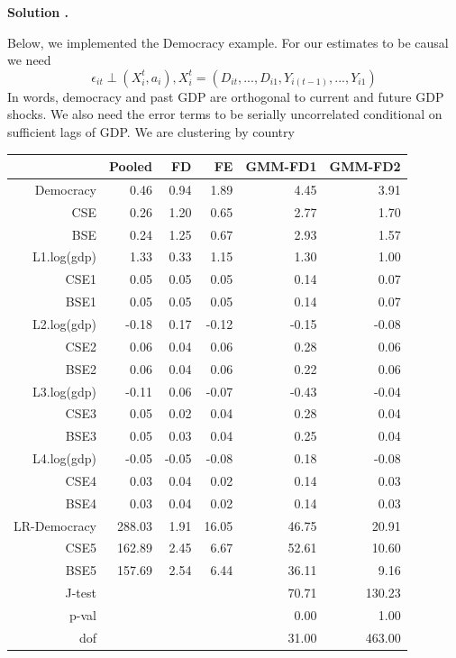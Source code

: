 \documentclass[11pt]{article}
\newenvironment{solution}[1]
    {\bigskip\noindent\textbf{Solution #1.} \par}
    {\medskip}
\begin{document}
\begin{solution}{}
Below, we implemented the Democracy example. For our estimates to be causal we need
\[\epsilon_{it} \perp (X_i^t, a_i), X_i^t = (D_{it}, ..., D_{i1}, Y_{i(t-1)}, ..., Y_{i1})\]
In words, democracy and past GDP are orthogonal to current and future GDP shocks. We also need the error terms to be serially uncorrelated conditional on sufficient lags of GDP. We are clustering by country 

\begin{table}[htbp]
\centering
\begin{tabular}{rrrrrr}
  \hline
 & Pooled & FD & FE & GMM-FD1 & GMM-FD2 \\ 
  \hline
Democracy & 0.46 & 0.94 & 1.89 & 4.45 & 3.91 \\ 
  CSE & 0.26 & 1.20 & 0.65 & 2.77 & 1.70 \\ 
  BSE & 0.24 & 1.25 & 0.67 & 2.93 & 1.57 \\ 
  L1.log(gdp) & 1.33 & 0.33 & 1.15 & 1.30 & 1.00 \\ 
  CSE1 & 0.05 & 0.05 & 0.05 & 0.14 & 0.07 \\ 
  BSE1 & 0.05 & 0.05 & 0.05 & 0.14 & 0.07 \\ 
  L2.log(gdp) & -0.18 & 0.17 & -0.12 & -0.15 & -0.08 \\ 
  CSE2 & 0.06 & 0.04 & 0.06 & 0.28 & 0.06 \\ 
  BSE2 & 0.06 & 0.04 & 0.06 & 0.22 & 0.06 \\ 
  L3.log(gdp) & -0.11 & 0.06 & -0.07 & -0.43 & -0.04 \\ 
  CSE3 & 0.05 & 0.02 & 0.04 & 0.28 & 0.04 \\ 
  BSE3 & 0.05 & 0.03 & 0.04 & 0.25 & 0.04 \\ 
  L4.log(gdp) & -0.05 & -0.05 & -0.08 & 0.18 & -0.08 \\ 
  CSE4 & 0.03 & 0.04 & 0.02 & 0.14 & 0.03 \\ 
  BSE4 & 0.03 & 0.04 & 0.02 & 0.14 & 0.03 \\ 
  LR-Democracy & 288.03 & 1.91 & 16.05 & 46.75 & 20.91 \\ 
  CSE5 & 162.89 & 2.45 & 6.67 & 52.61 & 10.60 \\ 
  BSE5 & 157.69 & 2.54 & 6.44 & 36.11 & 9.16 \\ 
  J-test &  &  &  & 70.71 & 130.23 \\ 
  p-val &  &  &  & 0.00 & 1.00 \\ 
  dof &  &  &  & 31.00 & 463.00 \\ 
   \hline
\end{tabular}
\end{table}
\end{solution}
\end{document}
